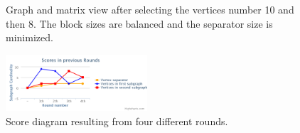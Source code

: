 \documentclass[12pt, oneside]{book}
\begin{document}
\begin{figure}
\centering
{}%
\caption{Graph and matrix view after selecting the vertices number 10 and then 8. The block sizes are balanced and the separator size is minimized.}
\label{selected810}
\end{figure}

\begin{figure}
\centering
\includegraphics[width=0.47\textwidth]{diagram}
\caption{Score diagram resulting from four different rounds.}
\label{diagram}
\end{figure}
\end{document}
